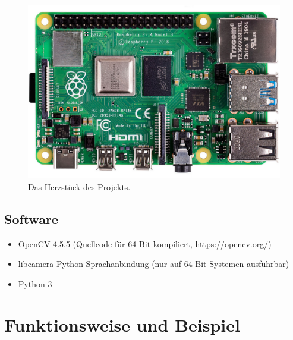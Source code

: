 \documentclass[12pt, a4paper]{article}
\begin{document}
	\begin{figure}[h]
		\centering
		\includegraphics[frame, scale=0.2]{rpi4.jpg}
		\caption{Das Herzstück des Projekts.}
	\end{figure}

	\subsection{Software}
	\begin{itemize}
		\item OpenCV 4.5.5 (Quellcode für 64-Bit kompiliert, \hyperlink{https://opencv.org/}{https://opencv.org/}) 
		\item libcamera Python-Sprachanbindung (nur auf 64-Bit Systemen ausführbar)
		\item Python 3
	\end{itemize}
	\newpage

	\section{Funktionsweise und Beispiel}
\end{document}
